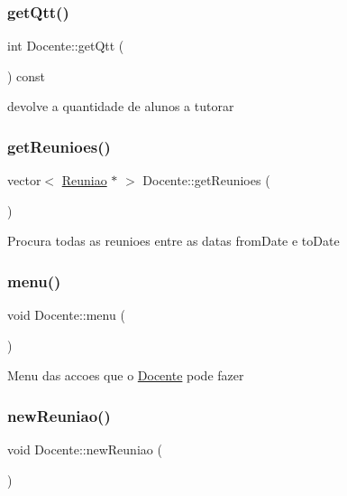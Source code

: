 \hypertarget{class_docente_a9fb95f3bee62cfaf9a358cf102feb7e8}{}\label{class_docente_a9fb95f3bee62cfaf9a358cf102feb7e8} 
\subsubsection{\texorpdfstring{get\+Qtt()}{getQtt()}}
{\footnotesize\ttfamily int Docente\+::get\+Qtt (\begin{DoxyParamCaption}{ }\end{DoxyParamCaption}) const}

devolve a quantidade de alunos a tutorar \hypertarget{class_docente_a8c7e74836d656bec642bb4ba3e3449c4}{}\label{class_docente_a8c7e74836d656bec642bb4ba3e3449c4} 
\subsubsection{\texorpdfstring{get\+Reunioes()}{getReunioes()}}
{\footnotesize\ttfamily vector$<$ \hyperlink{class_reuniao}{Reuniao} $\ast$ $>$ Docente\+::get\+Reunioes (\begin{DoxyParamCaption}{ }\end{DoxyParamCaption})}

Procura todas as reunioes entre as datas from\+Date e to\+Date \hypertarget{class_docente_aa566202f3f83b288b630095ff5493a26}{}\label{class_docente_aa566202f3f83b288b630095ff5493a26} 
\subsubsection{\texorpdfstring{menu()}{menu()}}
{\footnotesize\ttfamily void Docente\+::menu (\begin{DoxyParamCaption}{ }\end{DoxyParamCaption})}

Menu das accoes que o \hyperlink{class_docente}{Docente} pode fazer \hypertarget{class_docente_a69d24901234585a51e8dfe3dec22c00d}{}\label{class_docente_a69d24901234585a51e8dfe3dec22c00d} 
\subsubsection{\texorpdfstring{new\+Reuniao()}{newReuniao()}}
{\footnotesize\ttfamily void Docente\+::new\+Reuniao (\begin{DoxyParamCaption}{ }\end{DoxyParamCaption})}

